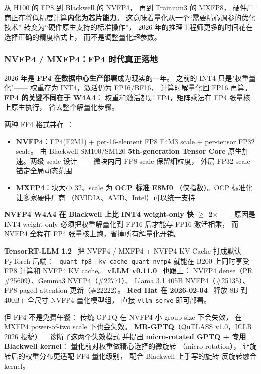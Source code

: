 从 H100 的 FP8 到 Blackwell 的 NVFP4，
再到 Trainium3 的 MXFP8，
硬件厂商正在将低精度计算\textbf{内化为芯片能力}。
这意味着量化从一个“需要精心调参的优化技术”
转变为“硬件原生支持的标准操作”，
2026 年的推理工程师更多的时间花在选择正确的精度格式上，
而不是调整量化超参数。

\subsubsection{NVFP4 / MXFP4：FP4 时代真正落地}

2026 年是 \textbf{FP4 在数据中心生产部署}成为现实的一年。
之前的 INT4 只是"权重量化"——
权重存为 INT4，激活仍为 FP16/BF16，
计算时解量化回 FP16 再算。
\textbf{FP4 的关键不同在于 W4A4}：
权重和激活都是 FP4，矩阵乘法在 FP4 张量核上原生执行，
省去整个解量化步骤。

两种 FP4 格式并存~\cite{nvfp4spec2026}：
\begin{itemize}[noitemsep]
  \item \textbf{NVFP4}：FP4(E2M1) + per-16-element FP8 E4M3 scale
        + per-tensor FP32 scale。
        由 Blackwell SM100/SM120 \textbf{5th-generation Tensor Core}
        原生加速。两级 scale 设计——
        微块内用 FP8 scale 保留细粒度，
        外层 FP32 scale 锚定全局动态范围
  \item \textbf{MXFP4}：块大小 32、scale 为 \textbf{OCP 标准 E8M0}
        （仅指数）。OCP 标准化让多家硬件厂商
        （NVIDIA、AMD、Intel）可以统一支持
\end{itemize}

\textbf{NVFP4 W4A4 在 Blackwell 上比 INT4 weight-only 快 $\geq$ 2$\times$}——
原因是 INT4 weight-only 必须把权重解量化到 FP16 后才能与 FP16 激活相乘，
而 NVFP4 全程在 FP4 张量核上跑，省掉所有解量化开销。

\textbf{TensorRT-LLM 1.2}~\cite{trtllm12}
把 NVFP4 / MXFP4 + NVFP4 KV Cache 打成默认 PyTorch 后端：
\texttt{--quant fp8 --kv\_cache\_quant nvfp4}
就能在 B200 上同时享受 FP8 计算和 NVFP4 KV cache。
\textbf{vLLM v0.11.0}~\cite{vllm011nvfp4} 也跟上：
NVFP4 dense（PR \#25609）、Gemma3 NVFP4（\#22771）、
Llama 3.1 405B NVFP4（\#25135）、
FP8 paged attention 更新（\#22222）。
\textbf{Red Hat 在 2026-02-04}~\cite{redhatNvfp42026}
释放 8B 到 400B+ 全尺寸 NVFP4 量化模型组，
直接 \texttt{vllm serve} 即可部署。

但 FP4 不是免费午餐：
传统 GPTQ 在 NVFP4 小 group size 下会失效，
在 MXFP4 power-of-two scale 下也会失效。
\textbf{MR-GPTQ}（QuTLASS v1.0，ICLR 2026 投稿）
~\cite{mrgptq2026} 诊断了这两个失效模式
并提出 \textbf{micro-rotated GPTQ + 专用 Blackwell kernel}：
量化前对权重做精心选择的微旋转
（micro-rotation），
让旋转后的权重分布更适配 FP4 量化级别，
配合 Blackwell 上手写的旋转-反旋转融合 kernel。

